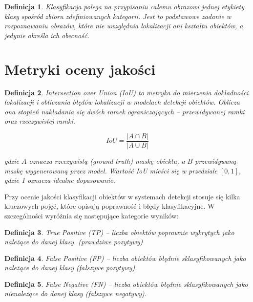 \documentclass[licencjacka]{pracamgr}
\newtheorem{defi}{Definicja}[section]
\begin{document}
\begin{defi}\label{klasyfikacja}
    \emph{Klasyfikacja} polega na przypisaniu całemu obrazowi jednej etykiety klasy spośród zbioru zdefiniowanych kategorii. Jest to podstawowe zadanie w rozpoznawaniu obrazów, które nie uwzględnia lokalizacji ani kształtu obiektów, a jedynie określa ich obecność.
\end{defi}

\section{Metryki oceny jakości}

\begin{defi}\label{iou}
\emph{Intersection over Union} (IoU) to metryka do mierzenia dokładności lokalizacji i obliczania błędów lokalizacji w modelach detekcji obiektów. Oblicza ona stopień nakładania się dwóch ramek ograniczających – przewidywanej ramki oraz rzeczywistej ramki.

\begin{equation}
IoU = \frac{|A \cap B|}{|A \cup B|}
\end{equation}

gdzie $A$ oznacza rzeczywistą (ground truth) maskę obiektu, a $B$ przewidywaną maskę wygenerowaną przez model. Wartość IoU mieści się w przedziale $[0,1]$, gdzie 1 oznacza idealne dopasowanie.
\end{defi}

Przy ocenie jakości klasyfikacji obiektów w systemach detekcji stosuje się kilka kluczowych pojęć, które opisują poprawność i błędy klasyfikacyjne. W szczególności wyróżnia się następujące kategorie wyników:

\begin{defi}\label{true_positive}
\emph{True Positive (TP)} – liczba obiektów poprawnie wykrytych jako należące do danej klasy. (prawdziwe pozytywy)
\end{defi}

\begin{defi}\label{false_positive}
\emph{False Positive (FP)} – liczba obiektów błędnie sklasyfikowanych jako należące do danej klasy (fałszywe pozytywy).
\end{defi}

\begin{defi}\label{false_negative}
\emph{False Negative (FN)} – liczba obiektów błędnie sklasyfikowanych jako nienależące do danej klasy (fałszywe negatywy).
\end{defi}
\end{document}
